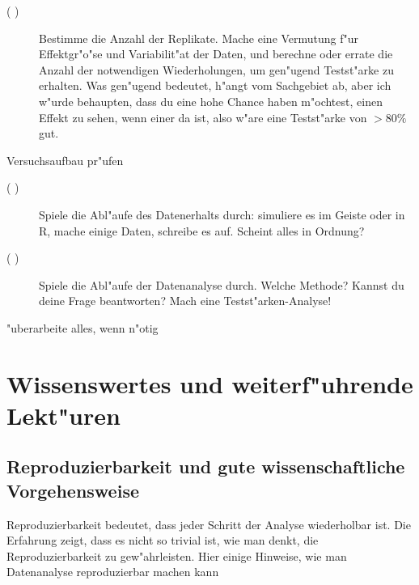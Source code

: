 \documentclass[a4paper,twoside]{tufte-book}\usepackage[]{graphicx}\usepackage[]{color}
\begin{document}
\begin{mdframed}
\begin{description}
\begin{description}
  \item[( )] Bestimme die Anzahl der Replikate. Mache eine Vermutung f"ur Effektgr"o"se und Variabilit"at der Daten, und berechne oder errate die Anzahl der notwendigen Wiederholungen, um gen"ugend Testst"arke zu erhalten. Was gen"ugend bedeutet, h"angt vom Sachgebiet ab, aber ich w"urde behaupten, dass du eine hohe Chance haben m"ochtest, einen Effekt zu sehen, wenn einer da ist, also w"are eine Testst"arke von $>80\%$ gut.
  
  \end{description}
  
\item[( )] Versuchsaufbau pr"ufen
  
  \begin{description}
  
  \item[( )] Spiele die Abl"aufe des Datenerhalts durch: simuliere es im Geiste oder in R, mache einige Daten, schreibe es auf. Scheint alles in Ordnung?
  
  \item[( )] Spiele die Abl"aufe der Datenanalyse durch. Welche Methode? Kannst du deine Frage beantworten? Mach eine Testst"arken-Analyse!

  \end{description}


\item[( )] "uberarbeite alles, wenn n"otig

\end{description}

\end{mdframed}


\chapter{Wissenswertes und weiterf"uhrende Lekt"uren}

\section{Reproduzierbarkeit und gute wissenschaftliche Vorgehensweise}

Reproduzierbarkeit bedeutet, dass jeder Schritt der Analyse wiederholbar ist. Die Erfahrung zeigt, dass es nicht so trivial ist, wie man denkt, die Reproduzierbarkeit zu gew"ahrleisten. Hier einige Hinweise, wie man Datenanalyse reproduzierbar machen kann
\end{document}
